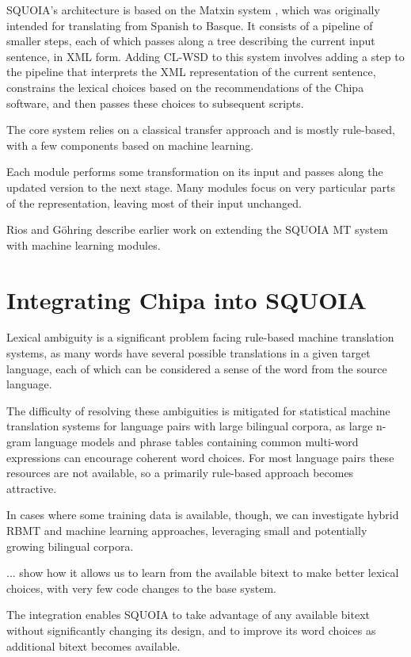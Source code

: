 SQUOIA's architecture is based on the Matxin system \cite{matxin2005}, which
was originally intended for translating from Spanish to Basque.
It consists of a pipeline of smaller steps, each of which passes along a tree
describing the current input sentence, in XML form. Adding CL-WSD to this
system involves adding a step to the pipeline that interprets the XML
representation of the current sentence, constrains the lexical choices based on
the recommendations of the Chipa software, and then passes these choices to
subsequent scripts.

The core system relies on a classical transfer approach and is mostly
rule-based, with a few components based on machine learning.

Each module performs some transformation on its input and
passes along the updated version to the next stage. Many modules focus on very
particular parts of the representation, leaving most of their input unchanged.

Rios and G\"{o}hring \cite{riosgonzales-gohring:2013:HyTra} describe
earlier work on extending the SQUOIA MT system with machine learning modules.

\section{Integrating Chipa into SQUOIA}
Lexical ambiguity is a significant problem facing rule-based machine
translation systems, as many words have several possible translations in a
given target language, each of which can be considered a sense of the word from
the source language.

The difficulty of resolving these ambiguities is mitigated for 
statistical machine translation systems for language pairs with large bilingual
corpora, as large n-gram language models and phrase tables containing common
multi-word expressions can encourage coherent word choices.
For most language pairs these resources are not available, so a primarily
rule-based approach becomes attractive.

In cases where some training data is available, though, we can
investigate hybrid RBMT and machine learning approaches, leveraging small and
potentially growing bilingual corpora.

... show how it allows us to learn from the available bitext to
make better lexical choices, with very few code changes to the base system.

The integration enables SQUOIA to take advantage of any available bitext
without significantly changing its design, and to improve its word choices as
additional bitext becomes available.


